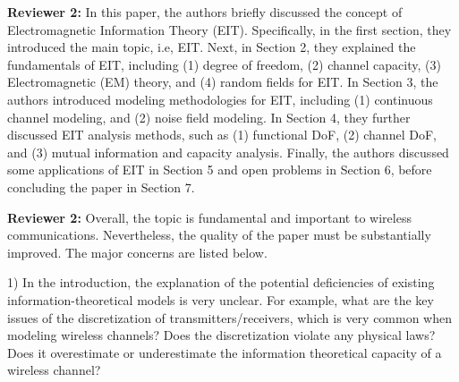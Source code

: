 \documentclass[a4paper,12pt]{article}
\begin{document}
\textbf{Reviewer 2:}
In this paper, the authors briefly discussed the concept of Electromagnetic Information Theory (EIT). Specifically, in the first section, they introduced the main topic, i.e, EIT. Next, in Section 2, they explained the fundamentals of EIT, including (1) degree of freedom, (2) channel capacity, (3) Electromagnetic (EM) theory, and (4) random fields for EIT. In Section 3, the authors introduced modeling methodologies for EIT, including (1) continuous channel modeling, and (2) noise field modeling. In Section 4, they further discussed EIT analysis methods, such as (1) functional DoF, (2) channel DoF, and (3) mutual information and capacity analysis. Finally, the authors discussed some applications of EIT in Section 5 and open problems in Section 6, before concluding the paper in Section 7.

{}


\textbf{Reviewer 2:}
Overall, the topic is fundamental and important to wireless communications. Nevertheless, the quality of the paper must be substantially improved. The major concerns are listed below.

1) In the introduction, the explanation of the potential deficiencies of existing information-theoretical models is very unclear. For example, what are the key issues of the discretization of transmitters/receivers, which is very common when modeling wireless channels? Does the discretization violate any physical laws? Does it overestimate or underestimate the information theoretical capacity of a wireless channel?
\end{document}
